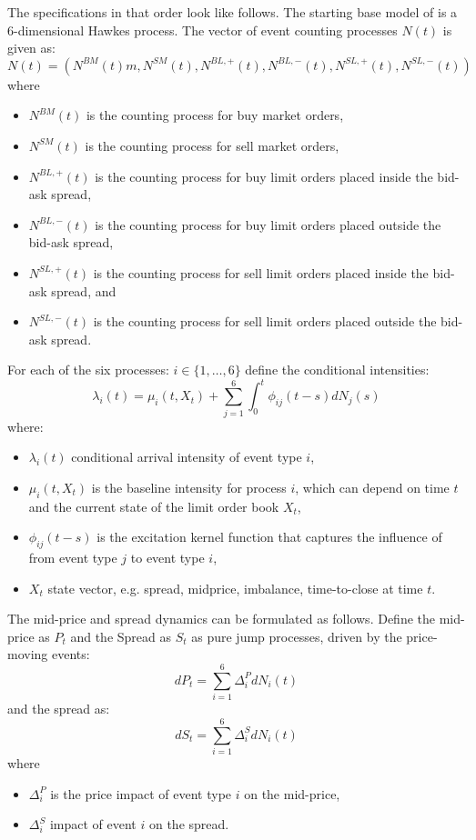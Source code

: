 \documentclass[12pt,a4paper]{cau_thesis}
\begin{document}
The specifications in that order look like follows. The starting base
model of \cite{luckner2021hawkes} is a 6-dimensional Hawkes process.
The vector of event counting processes $N(t)$ is given as:
\begin{equation}\label{eq:vector_event_counting_processes}
    N(t) = (N^{BM}(t)m, N^{SM}(t), N^{BL, +}(t), N^{BL, -}(t), N^{SL, +}(t), N^{SL, -}(t))
\end{equation}
where
\begin{itemize}
    \item $N^{BM}(t)$ is the counting process for buy market orders,
    \item $N^{SM}(t)$ is the counting process for sell market orders,
    \item $N^{BL, +}(t)$ is the counting process for buy limit orders placed inside the bid-ask spread,
    \item $N^{BL, -}(t)$ is the counting process for buy limit orders placed outside the bid-ask spread,
    \item $N^{SL, +}(t)$ is the counting process for sell limit orders placed inside the bid-ask spread, and
    \item $N^{SL, -}(t)$ is the counting process for sell limit orders placed outside the bid-ask spread.
\end{itemize}
For each of the six processes: $i \in \{1, \ldots, 6\}$ define the conditional intensities:
\begin{equation}\label{eq:conditional_intensities}
    \lambda_{i}(t) = \mu_{i}(t, X_{t}) + \sum_{j=1}^{6} \int_{0}^{t} \phi_{ij}(t - s) dN_{j}(s)
\end{equation}
where:
\begin{itemize}
    \item $\lambda_{i}(t)$ conditional arrival intensity of event type $i$,
    \item $\mu_{i}(t, X_{t})$ is the baseline intensity for process $i$, which can depend on time $t$ and the current state of the limit order book $X_{t}$,
    \item $\phi_{ij}(t - s)$ is the excitation kernel function that captures the influence of from event type $j$ to event type $i$,
    \item $X_{t}$ state vector, e.g. spread, midprice, imbalance, time-to-close at time $t$.
\end{itemize}
The mid-price and spread dynamics can be formulated as follows.
Define the mid-price as $P_{t}$ and the Spread as $S_{t}$ as pure jump processes, driven
by the price-moving events:
\begin{equation}
    dP_{t} = \sum_{i=1}^{6} \Delta_{i}^{P} dN_{i}(t)
\end{equation}
and the spread as:
\begin{equation}
    dS_{t} = \sum_{i=1}^{6} \Delta_{i}^{S} dN_{i}(t)
\end{equation}
where
\begin{itemize}
    \item $\Delta_{i}^{P}$ is the price impact of event type $i$ on the mid-price,
    \item $\Delta_{i}^{S}$ impact of event $i$ on the spread.
\end{itemize}
\end{document}
